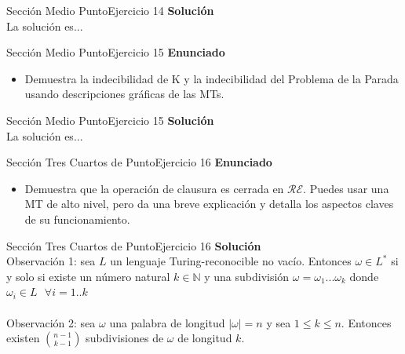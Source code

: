 \documentclass[10pt, envcountsect, presentation, aspectratio=169]{beamer}
\newcommand{\lr}{\ensuremath{\mathcal {RE}}}
\begin{document}

\begin{frame}{Sección Medio Punto}{Ejercicio 14}
    \textbf{Solución}\\
    La solución es...
\end{frame}


\begin{frame}{Sección Medio Punto}{Ejercicio 15}
    \textbf{Enunciado}
    \begin{itemize}
        \item Demuestra la indecibilidad de K y la indecibilidad del Problema de la Parada usando descripciones gráficas de las MTs.
    \end{itemize}
\end{frame}


\begin{frame}{Sección Medio Punto}{Ejercicio 15}
    \textbf{Solución}\\
    La solución es...
\end{frame}


\begin{frame}{Sección Tres Cuartos de Punto}{Ejercicio 16}
    \textbf{Enunciado}
    \begin{itemize}
        \item Demuestra que la operación de clausura es cerrada en $\lr$. Puedes usar una MT de alto nivel, pero da una breve explicación y detalla los aspectos claves de su funcionamiento.
    \end{itemize}
\end{frame}


\begin{frame}{Sección Tres Cuartos de Punto}{Ejercicio 16}
    \textbf{Solución}\\
    Observación 1: sea $L$ un lenguaje Turing-reconocible no vacío. 
    Entonces $\omega \in L^*$ si y solo si existe un número natural $k \in \mathbb{N}$ y una subdivisión $\omega = \omega_1...\omega_k$ donde $\omega_i \in L \text{ } \forall i = 1..k$\\~\\

    Observación 2: sea $\omega$ una palabra de longitud $|\omega|=n$ y sea $1 \leq k \leq n$.
    Entonces existen ${n-1}\choose{k-1}$ subdivisiones de $\omega$ de longitud $k$.
\end{frame}
\end{document}

